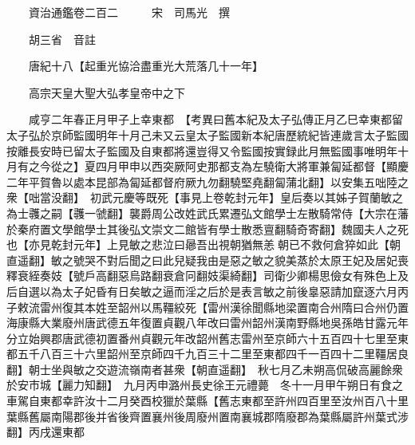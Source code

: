 










 


 
 


 

  
  
  
  
  





  
  
  
  
  
 
  

  

  
  
  



  

 
 

  
   




  

  
  


  　　資治通鑑卷二百二　　　宋　司馬光　撰

　　胡三省　音註

　　唐紀十八【起重光協洽盡重光大荒落几十一年】

　　高宗天皇大聖大弘孝皇帝中之下

　　咸亨二年春正月甲子上幸東都　【考異曰舊本紀及太子弘傳正月乙巳幸東都留太子弘於京師監國明年十月己未又云皇太子監國新本紀唐歷統紀皆連歲言太子監國按離長安時已留太子監國及自東都將還豈得又令監國按實録此月無監國事唯明年十月有之今從之】夏四月甲申以西突厥阿史那都支為左驍衛大將軍兼匐延都督【顯慶二年平賀魯以處本昆部為匐延都督府厥九勿翻驍堅堯翻匐蒲北翻】以安集五咄陸之衆【咄當没翻】　初武元慶等既死【事見上卷乾封元年】皇后奏以其姊子賀蘭敏之為士彠之嗣【彠一虢翻】襲爵周公改姓武氏累遷弘文館學士左散騎常侍【大宗在藩於秦府置文學館學士其後弘文崇文二館皆有學士散悉亶翻騎奇寄翻】魏國夫人之死也【亦見乾封元年】上見敏之悲泣曰曏吾出視朝猶無恙朝已不救何倉猝如此【朝直遥翻】敏之號哭不對后聞之曰此兒疑我由是惡之敏之貌美蒸於太原王妃及居妃喪釋衰絰奏妓【號戶高翻惡烏路翻衰倉冋翻妓渠綺翻】司衛少卿楊思儉女有殊色上及后自選以為太子妃昏有日矣敏之逼而淫之后於是表言敏之前後辠惡請加竄逐六月丙子敕流雷州復其本姓至韶州以馬韁絞死【雷州漢徐聞縣地梁置南合州隋曰合州仍置海康縣大業廢州唐武德五年復置貞觀八年改曰雷州韶州漢南野縣地吳孫皓甘露元年分立始興郡唐武德初置番州貞觀元年改韶州舊志雷州至京師六十五百四十七里至東都五千八百三十六里韶州至京師四千九百三十二里至東都四千一百四十二里韁居良翻】朝士坐與敏之交遊流嶺南者甚衆【朝直遥翻】　秋七月乙未朔高侃破高麗餘衆於安市城【麗力知翻】　九月丙申潞州長史徐王元禮薨　冬十一月甲午朔日有食之　車駕自東都幸許汝十二月癸酉校獵於葉縣【舊志東都至許州四百里至汝州百八十里葉縣舊屬南陽郡後并省後齊置襄州後周廢州置南襄城郡隋廢郡為葉縣屬許州葉式涉翻】丙戌還東都

